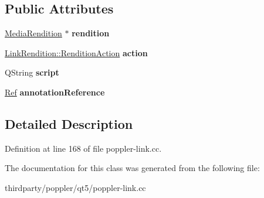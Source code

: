 \subsection*{Public Attributes}
\begin{DoxyCompactItemize}
\item 
\mbox{\label{class_poppler_1_1_link_rendition_private_a0a300e679b57828b1d25a09eac3ced43}} 
\hyperlink{class_poppler_1_1_media_rendition}{Media\+Rendition} $\ast$ {\bfseries rendition}
\item 
\mbox{\label{class_poppler_1_1_link_rendition_private_a1127d1d4436c09ef16b55e8b584b3e16}} 
\hyperlink{class_poppler_1_1_link_rendition_aede1a6b7156fe8973bdbeda39173704d}{Link\+Rendition\+::\+Rendition\+Action} {\bfseries action}
\item 
\mbox{\label{class_poppler_1_1_link_rendition_private_a1352fd4308b6b91a66679a956574668e}} 
Q\+String {\bfseries script}
\item 
\mbox{\label{class_poppler_1_1_link_rendition_private_aa7027d604870543ab6b55656d834f609}} 
\hyperlink{struct_ref}{Ref} {\bfseries annotation\+Reference}
\end{DoxyCompactItemize}


\subsection{Detailed Description}


Definition at line 168 of file poppler-\/link.\+cc.



The documentation for this class was generated from the following file\+:\begin{DoxyCompactItemize}
\item 
thirdparty/poppler/qt5/poppler-\/link.\+cc\end{DoxyCompactItemize}
